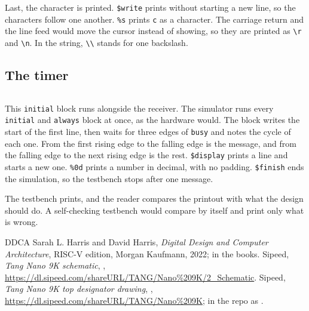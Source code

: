 \documentclass[11pt,a4paper]{article}
\begin{document}
Last, the character is printed. \texttt{\$write} prints without starting a new line, so the characters follow one another. \texttt{\%s} prints \texttt{c} as a character. The carriage return and the line feed would move the cursor instead of showing, so they are printed as \texttt{\textbackslash r} and \texttt{\textbackslash n}. In the string, \texttt{\textbackslash\textbackslash} stands for one backslash.

\subsection*{The timer}

\inputminted[firstline=39, lastline=49]{verilog}{../sim/hello_tb.v}

This \texttt{initial} block runs alongside the receiver. The simulator runs every \texttt{initial} and \texttt{always} block at once, as the hardware would. The block writes the start of the first line, then waits for three edges of \texttt{busy} and notes the cycle of each one. From the first rising edge to the falling edge is the message, and from the falling edge to the next rising edge is the rest. \texttt{\$display} prints a line and starts a new one. \texttt{\%0d} prints a number in decimal, with no padding. \texttt{\$finish} ends the simulation, so the testbench stops after one message.

The testbench prints, and the reader compares the printout with what the design should do. A self-checking testbench would compare by itself and print only what is wrong.

\begin{thebibliography}{DDCA}
 Sarah L. Harris and David Harris, \textit{Digital Design and Computer Architecture}, RISC-V edition, Morgan Kaufmann, 2022;  in the books.
 Sipeed, \textit{Tang Nano 9K schematic}, , \url{https://dl.sipeed.com/shareURL/TANG/Nano%209K/2_Schematic}.
 Sipeed, \textit{Tang Nano 9K top designator drawing}, , \url{https://dl.sipeed.com/shareURL/TANG/Nano\%209K}; in the repo as .
\end{thebibliography}

\revisiontable
\end{document}
